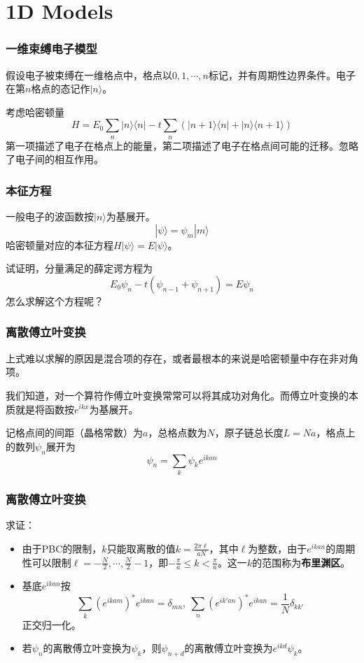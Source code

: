 \documentclass[CJK]{beamer}
\def\secpage#1#2{\begin{frame}\bch\bcenter{\bf \Huge #1} \skipline \tbox{#2}\ecenter\ech\end{frame}}
\begin{document}
\section{1D Models}

\secpage{一维固体模型}{离散平移对称性}

\begin{frame}
\frametitle{\bch 一维束缚电子模型 \ech}
\bch
假设电子被束缚在一维格点中，格点以$0,1,\cdots,n$标记，并有周期性边界条件。电子在第$n$格点的态记作$|n\rangle$。
\par
考虑哈密顿量
$$
H = E_0 \sum_n |n \rangle \langle n | - t \sum_n \left( |n+1 \rangle \langle n | + |n\rangle \langle n+1 \rangle \right)
$$
第一项描述了电子在格点上的能量，第二项描述了电子在格点间可能的迁移。忽略了电子间的相互作用。
\ech
\end{frame}

\begin{frame}
\frametitle{\bch 本征方程 \ech}
\bch
一般电子的波函数按$|n\rangle$为基展开。
$$
| \psi \rangle = \psi_m |m \rangle
$$
哈密顿量对应的本征方程$H |\psi \rangle = E | \psi \rangle$。
\par
试证明，分量满足的薛定谔方程为
$$
E_0 \psi_n - t (\psi_{n-1} + \psi_{n+1} ) = E\psi_n
$$
怎么求解这个方程呢？
\ech
\end{frame}


\begin{frame}
\frametitle{\bch 离散傅立叶变换 \ech}
\bch
上式难以求解的原因是混合项的存在，或者最根本的来说是哈密顿量中存在非对角项。
\par
我们知道，对一个算符作傅立叶变换常常可以将其成功对角化。而傅立叶变换的本质就是将函数按$e^{ikx}$为基展开。
\par
记格点间的间距（晶格常数）为$a$，总格点数为$N$，原子链总长度$L = Na$，格点上的数列$\psi_n$展开为
$$
\psi_n = \sum_k \psi_k e^{ikan}
$$

\ech
\end{frame}

\begin{frame}
\frametitle{\bch 离散傅立叶变换 \ech}
\bch
求证：
\begin{itemize}
\item 由于PBC的限制，$k$只能取离散的值$k = \frac{2\pi \ell}{aN}$，其中$\ell$为整数，由于$e^{ikan}$的周期性可以限制$\ell = -\frac{N}{2}, \cdots ,\frac{N}{2}-1$，即$-\frac{\pi}{a} \leq k < \frac{\pi}{a}$。这一$k$的范围称为{\bf 布里渊区}。
\item 基底$e^{ikan}$按$$\sum_k (e^{ikam})^* e^{ikan} = \delta_{mn},\ \sum_n (e^{ik'a n})^* e^{ikan} = \frac{1}{N} \delta_{kk'}$$正交归一化。
\item 若$\psi_n$的离散傅立叶变换为$\psi_k$，则$\psi_{n+d}$的离散傅立叶变换为$e^{ikd} \psi_k$。
\end{itemize}

\ech
\end{frame}
\end{document}
